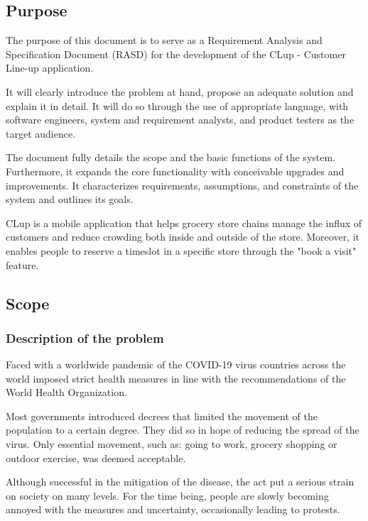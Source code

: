 \subsection{Purpose}
\hspace{\parindent}The purpose of this document is to serve as a Requirement Analysis and Specification Document (RASD) for the development of the CLup - Customer Line-up application.

It will clearly introduce the problem at hand, propose an adequate solution and explain it in detail. It will do so through the use of appropriate language, with software engineers, system and requirement analysts, and product testers as the target audience. 

The document fully details the scope and the basic functions of the system. Furthermore, it expands the core functionality with conceivable upgrades and improvements. It characterizes requirements, assumptions, and constraints of the system and outlines its goals. 

CLup is a mobile application that helps grocery store chains manage the influx of customers and reduce crowding both inside and outside of the store. Moreover, it enables people to reserve a timeslot in a specific store through the "book a visit" feature. 

\newpage

\subsection{Scope}
\subsubsection{Description of the problem}
\hspace{\parindent}Faced with a worldwide pandemic of the COVID-19 virus countries across the world imposed strict health measures in line with the recommendations of the World Health Organization. 

Most governments introduced decrees that limited the movement of the population to a certain degree. They did so in hope of reducing the spread of the virus. Only essential movement, such as: going to work, grocery shopping or outdoor exercise, was deemed acceptable. 

Although successful in the mitigation of the disease, the act put a serious strain on society on many levels. For the time being, people are slowly becoming annoyed with the measures and uncertainty, occasionally leading to protests.

